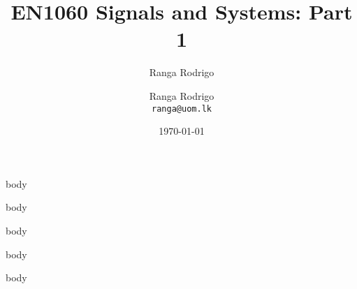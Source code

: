 \documentclass[t, aspectratio=169,xcolor={svgnames}, 10pt, handout]{beamer}
\title{EN1060 Signals and Systems: Part 1}
\author{Ranga Rodrigo}
\author[]{Ranga Rodrigo\\ \texttt{ranga@uom.lk}}
\institute[]{The University of Moratuwa, Sri Lanka}
\date{\today}
\begin{document}
    \begin{frame}
        \titlepage
    \end{frame}


    {body}

    {body}


    {body}


    {body}

    {body}










\end{document}
